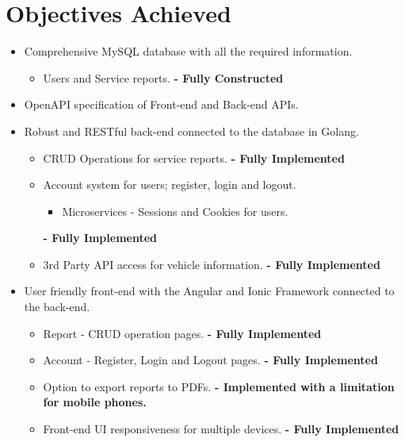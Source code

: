 \section{Objectives Achieved}
\begin{itemize}
    \item Comprehensive MySQL database with all the required information. \checkmark 
     \begin{itemize} 
        \item Users and Service reports. \newline \textbf{- Fully Constructed}
    \end{itemize}
    \item OpenAPI specification of Front-end and Back-end APIs. \checkmark 
    \item Robust and RESTful back-end connected to the database in Golang. \checkmark 
    \begin{itemize} 
        \item CRUD Operations for service reports. 
        \newline \textbf{- Fully Implemented}
        \item Account system for users; register, login and logout.
        \begin{itemize} 
            \item Microservices - Sessions and Cookies for users.
        \end{itemize}
        \textbf{- Fully Implemented}
        \item 3rd Party API access for vehicle information. \newline \textbf{- Fully Implemented}
    \end{itemize}
    \item User friendly front-end with the Angular and Ionic Framework connected to the back-end. 
    \checkmark 
    \begin{itemize} 
        \item Report - CRUD operation pages.
        \newline \textbf{- Fully Implemented}
        \item Account - Register, Login and Logout pages.
        \newline \textbf{- Fully Implemented}
        \item Option to export reports to PDFs. 
        \newline \textbf{- Implemented with a limitation for mobile phones.}
        \item Front-end UI responsiveness for multiple devices. \newline \textbf{- Fully Implemented}

\end{itemize}
\end{itemize}
